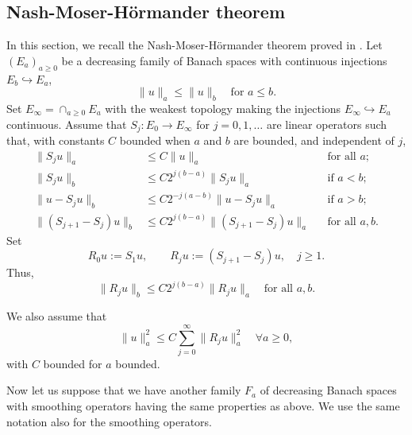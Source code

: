 \documentclass[12pt]{amsart}
\theoremstyle{remark}
\theoremstyle{definition}
\numberwithin{equation}{section}
\begin{document}
\subsection{Nash-Moser-H\"ormander theorem}
In this section, we recall the Nash-Moser-H\"ormander theorem proved in \cite{MR3711883}.
Let $(E_a)_{a\geq 0}$ be a decreasing family of Banach spaces with continuous injections $E_b \hookrightarrow E_a$,
\begin{equation}
    \|u\|_a \leq \|u\|_b \quad \text{for } a \leq b. 
\end{equation}
Set $E_\infty = \cap_{a \geq 0} E_a$ with the weakest topology making the injections $E_\infty \hookrightarrow E_a$ continuous. 
Assume that $S_j : E_0 \to E_\infty$ for $j = 0, 1, \dots$ are linear operators such that, with constants $C$ bounded when $a$ and $b$ are bounded, and independent of $j$,
\begin{align}
    \|S_j u\|_a &\leq C \|u\|_a && \text{for all } a;  \\
    \|S_j u\|_b &\leq C 2^{j(b-a)} \|S_j u\|_a && \text{if } a < b;  \\
    \|u - S_j u\|_b &\leq C 2^{-j(a-b)} \|u - S_j u\|_a && \text{if } a > b;  \\
    \|(S_{j+1} - S_j)u\|_b &\leq C 2^{j(b-a)} \|(S_{j+1} - S_j)u\|_a && \text{for all } a, b. 
\end{align}
Set
\begin{equation}
    R_0 u := S_1 u, \qquad R_j u := (S_{j+1} - S_j)u, \quad j \geq 1. 
\end{equation}
Thus,
\begin{equation}
    \|R_j u\|_b \leq C 2^{j(b-a)} \|R_j u\|_a \quad \text{for all } a, b. 
\end{equation}


We also assume that
\begin{equation}
    \|u\|_a^2 \leq C \sum_{j=0}^\infty \|R_j u\|_a^2 \quad \forall a \geq 0, 
\end{equation}
with $C$ bounded for $a$ bounded.

Now let us suppose that we have another family $F_a$ of decreasing Banach spaces with smoothing operators having the same properties as above. We use the same notation also for the smoothing operators.
\end{document}
